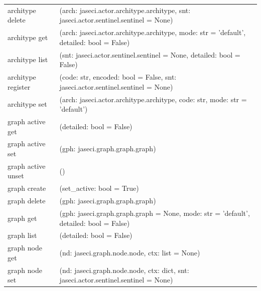 {\begin{longtable}{l p{10cm}}
        architype delete       & (arch: jaseci.actor.architype.architype, snt: jaseci.actor.sentinel.sentinel = None)                                  \\
        architype get          & (arch: jaseci.actor.architype.architype, mode: str = 'default', detailed: bool = False)                               \\
        architype list         & (snt: jaseci.actor.sentinel.sentinel = None, detailed: bool = False)                                                  \\
        architype register     & (code: str, encoded: bool = False, snt: jaseci.actor.sentinel.sentinel = None)                                        \\
        architype set          & (arch: jaseci.actor.architype.architype, code: str, mode: str = 'default')                                            \\
        graph active get       & (detailed: bool = False)                                                                                              \\
        graph active set       & (gph: jaseci.graph.graph.graph)                                                                                       \\
        graph active unset     & ()                                                                                                                    \\
        graph create           & (set\_active: bool = True)                                                                                            \\
        graph delete           & (gph: jaseci.graph.graph.graph)                                                                                       \\
        graph get              & (gph: jaseci.graph.graph.graph = None, mode: str = 'default', detailed: bool = False)                                 \\
        graph list             & (detailed: bool = False)                                                                                              \\
        graph node get         & (nd: jaseci.graph.node.node, ctx: list = None)                                                                        \\
        graph node set         & (nd: jaseci.graph.node.node, ctx: dict, snt: jaseci.actor.sentinel.sentinel = None)                                   \\

\end{longtable}}
